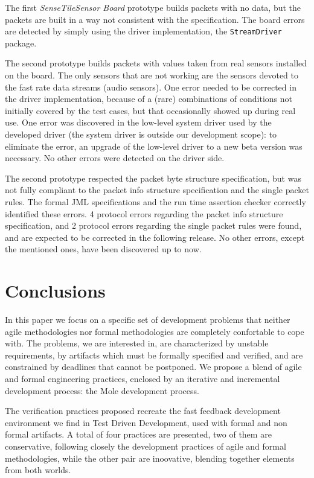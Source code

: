 \documentclass[english]{lni}
\newcommand{\lil}[1]{\texttt{\lstinline|#1|}}
\newcommand{\ST}{\emph{SenseTile}\xspace}
\newcommand{\SB}{\emph{Sensor Board}\xspace}
\newcommand{\STSB}{\ST \SB\xspace}
\begin{document}
The first \STSB prototype builds packets with no data, but the packets are built in a way not consistent with the specification.  
The board errors are detected by simply using the driver implementation, the \lil{StreamDriver} package.

The second prototype builds packets with values taken from real sensors installed on the board.  
The only sensors that are not working are the sensors devoted to the fast rate data streams (audio sensors).  
One error needed to be corrected in the driver implementation, because of a (rare) combinations of conditions not initially covered by the test cases, but that occasionally showed up during real use.
One error was discovered in the low-level system driver used by the developed driver (the system driver is outside our development scope): to eliminate the error, an upgrade of the low-level driver to a new beta version was necessary. 
No other errors were detected on the driver side.

The second prototype respected the packet byte structure specification, but was not fully compliant to the packet info structure specification and the single packet rules.
The formal JML specifications and the run time assertion checker correctly identified these errors.
4 protocol errors regarding the packet info structure specification, and 2 protocol errors regarding the single packet rules were found, and are expected to be corrected in the following release. 
No other errors, except the mentioned ones, have been discovered up to now.



\section{Conclusions}
\label{sec:conclusions}

In this paper we focus on a specific set of development problems that neither agile methodologies nor formal methodologies are completely confortable to cope with.
The problems, we are interested in, are characterized by unstable requirements, by artifacts which must be formally specified and verified, and are constrained by deadlines that cannot be postponed.
We propose a blend of agile and formal engineering practices, enclosed by an iterative and incremental development process: the Mole development process.

The verification practices proposed recreate the fast feedback development environment we find in Test Driven Development, used with formal and non formal artifacts.
A total of four practices are presented, two of them are conservative, following closely the development practices of agile and formal methodologies, while the other pair are inoovative, blending together elements from both worlds.
\end{document}
